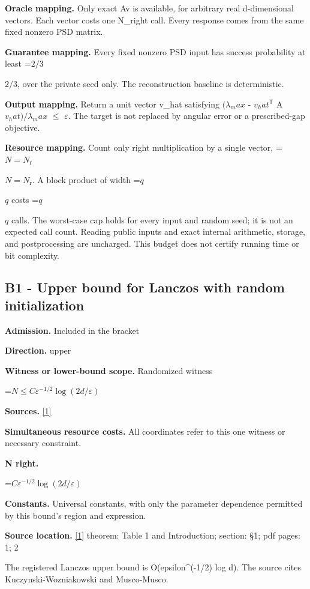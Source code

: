\documentclass[10pt,a4paper]{article}
\newcommand{\AtlasMath}[1]{\par\begingroup\centering\setbox0=\hbox{$\displaystyle #1$}\ifdim\wd0>1.4\linewidth\typeout{ATLAS WIDE FORMULA: \the\wd0}\fi\ifdim\wd0>\linewidth\resizebox{\linewidth}{!}{\box0}\else\box0\fi\par\endgroup}
\newcommand{\AtlasInlineMath}[1]{\begingroup\setbox0=\hbox{$#1$}\ifdim\wd0>.4\linewidth\endgroup\AtlasMath{#1}\else\endgroup$#1$\fi}
\begin{document}
\textbf{Oracle mapping.} Only exact Av is available, for arbitrary real d-dimensional vectors. Each vector costs one N\_right call. Every response comes from the same fixed nonzero PSD matrix.

\textbf{Guarantee mapping.} Every fixed nonzero PSD input has success probability at least \AtlasInlineMath{2/3}, over the private seed only. The reconstruction baseline is deterministic.

\textbf{Output mapping.} Return a unit vector v\_hat satisfying $(\lambda _max$ - $v_hat^{\mathsf T}$ A $v_hat)/\lambda _max$ $\le$ $\varepsilon$. The target is not replaced by angular error or a prescribed-gap objective.

\textbf{Resource mapping.} Count only right multiplication by a single vector, \AtlasInlineMath{N=N_{\mathrm r}}. A block product of width \AtlasInlineMath{q} costs \AtlasInlineMath{q} calls. The worst-case cap holds for every input and random seed; it is not an expected call count. Reading public inputs and exact internal arithmetic, storage, and postprocessing are uncharged. This budget does not certify running time or bit complexity.

\subsection{B1 - Upper bound for Lanczos with random initialization}
\textbf{Admission.} Included in the bracket

\textbf{Direction.} upper

\textbf{Witness or lower-bound scope.} Randomized witness

\AtlasMath{N\le C\varepsilon^{-1/2}\log(2d/\varepsilon)}
\textbf{Sources.} \href{https://proceedings.mlr.press/v125/braverman20a/braverman20a.pdf}{[1]}

\textbf{Simultaneous resource costs.} All coordinates refer to this one witness or necessary constraint.

\textbf{N right.}

\AtlasMath{C\varepsilon^{-1/2}\log(2d/\varepsilon)}
\textbf{Constants.} Universal constants, with only the parameter dependence permitted by this bound’s region and expression.

\textbf{Source location.} \href{https://proceedings.mlr.press/v125/braverman20a/braverman20a.pdf}{[1]} theorem: Table 1 and Introduction; section: §1; pdf pages: 1; 2

The registered Lanczos upper bound is O(epsilon\textasciicircum{}(-1/2) log d). The source cites Kuczynski-Wozniakowski and Musco-Musco.
\end{document}
